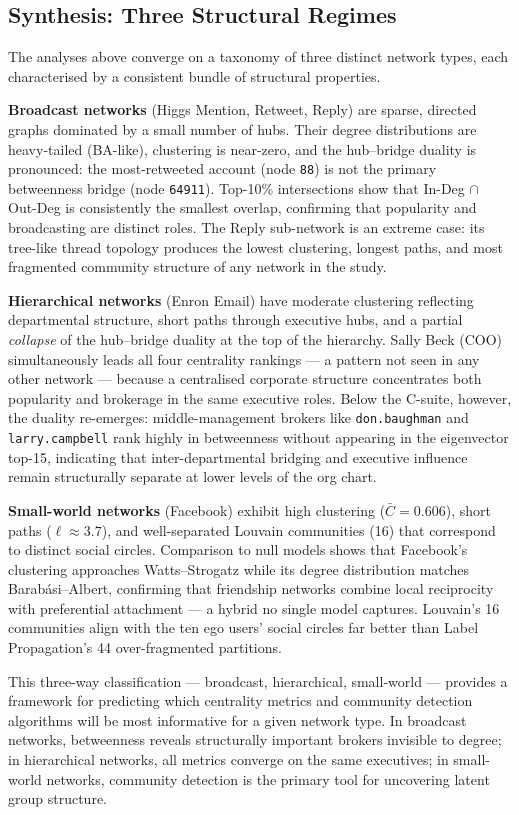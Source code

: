 \subsection{Synthesis: Three Structural Regimes}

The analyses above converge on a taxonomy of three distinct network types,
each characterised by a consistent bundle of structural properties.

\textbf{Broadcast networks} (Higgs Mention, Retweet, Reply) are sparse,
directed graphs dominated by a small number of hubs.
Their degree distributions are heavy-tailed (BA-like), clustering is
near-zero, and the hub--bridge duality is pronounced: the most-retweeted
account (node \texttt{88}) is not the primary betweenness bridge
(node \texttt{64911}).
Top-10\% intersections show that In-Deg $\cap$ Out-Deg is consistently
the smallest overlap, confirming that popularity and broadcasting are
distinct roles.
The Reply sub-network is an extreme case: its tree-like thread topology
produces the lowest clustering, longest paths, and most fragmented
community structure of any network in the study.

\textbf{Hierarchical networks} (Enron Email) have moderate clustering
reflecting departmental structure, short paths through executive hubs,
and a partial \textit{collapse} of the hub--bridge duality at the top
of the hierarchy.
Sally Beck (COO) simultaneously leads all four centrality rankings — a
pattern not seen in any other network — because a centralised corporate
structure concentrates both popularity and brokerage in the same executive
roles.
Below the C-suite, however, the duality re-emerges: middle-management
brokers like \texttt{don.baughman} and \texttt{larry.campbell} rank
highly in betweenness without appearing in the eigenvector top-15,
indicating that inter-departmental bridging and executive influence
remain structurally separate at lower levels of the org chart.

\textbf{Small-world networks} (Facebook) exhibit high clustering
($\bar{C} = 0.606$), short paths ($\ell \approx 3.7$), and well-separated
Louvain communities (16) that correspond to distinct social circles.
Comparison to null models shows that Facebook's clustering approaches
Watts--Strogatz while its degree distribution matches Barab\'asi--Albert,
confirming that friendship networks combine local reciprocity with
preferential attachment — a hybrid no single model captures.
Louvain's 16 communities align with the ten ego users' social circles
far better than Label Propagation's 44 over-fragmented partitions.

This three-way classification — broadcast, hierarchical, small-world —
provides a framework for predicting which centrality metrics and
community detection algorithms will be most informative for a given
network type.
In broadcast networks, betweenness reveals structurally important
brokers invisible to degree; in hierarchical networks, all metrics
converge on the same executives; in small-world networks, community
detection is the primary tool for uncovering latent group structure.
